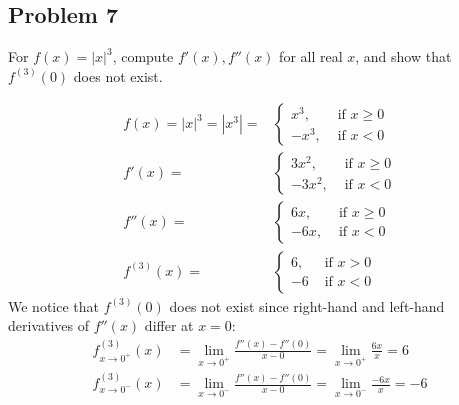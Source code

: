 \documentclass{article}
\begin{document}
\subsection*{Problem 7}

\begin{tcolorbox}
For $f(x) = |x|^3$, compute $f'(x), f''(x)$ for all real $x$, and show that $f^{(3)}(0)$ does not exist.
\end{tcolorbox}

\begin{align*}
    f(x) =
    |x|^3 = |x^3| = & \begin{cases}
        x^3, & \text{ if $x \geq 0$} \\
        -x^3, & \text{ if $x < 0$}
    \end{cases} \\
    f'(x) = &
    \begin{cases}
        3x^2, & \text{ if $x \geq 0$} \\
        -3x^2, & \text{ if $x < 0$}
    \end{cases} \\
    f''(x) = &
    \begin{cases}
        6x, & \text{ if $x \geq 0$} \\
        -6x, & \text{ if $x < 0$}
    \end{cases} \\
    f^{(3)}(x) = & 
    \begin{cases}
        6, & \text{ if $x > 0$} \\
        -6 & \text{ if $x < 0$}
    \end{cases}
\end{align*}
We notice that $f^{(3)}(0)$ does not exist since right-hand and left-hand derivatives of $f''(x)$ differ at $x=0$:
\begin{align*}
    f_{x \to 0^+}^{(3)}(x) & = \lim_{x \to 0^+} \frac{f''(x)-f''(0)}{x-0} = \lim_{x \to 0^+} \frac{6x}{x} = 6 \\
    f_{x \to 0^-}^{(3)}(x) & = \lim_{x \to 0^-} \frac{f''(x)-f''(0)}{x-0} = \lim_{x \to 0^-} \frac{-6x}{x} = -6
\end{align*}
\end{document}
